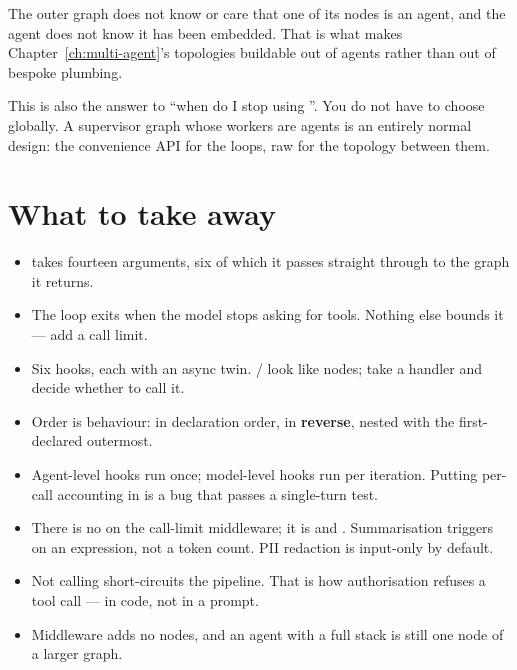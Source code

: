 The outer graph does not know or care that one of its nodes is an agent, and the
agent does not know it has been embedded. That is what makes
Chapter~\ref{ch:multi-agent}'s topologies buildable out of agents rather than out
of bespoke plumbing.

\begin{note}
This is also the answer to ``when do I stop using ''. You do
not have to choose globally. A supervisor graph whose workers are
 agents is an entirely normal design: the convenience API for
the loops, raw  for the topology between them.
\end{note}

\section{What to take away}
\label{sec:ch7-summary}

\begin{itemize}[leftmargin=1.4em]
\item {} takes fourteen arguments, six of which it passes
      straight through to the graph it returns.
\item The loop exits when the model stops asking for tools. Nothing else bounds
      it --- add a call limit.
\item Six hooks, each with an async twin. / look
      like nodes;  take a handler and decide whether to call it.
\item Order is behaviour:  in declaration order, 
      in \textbf{reverse},  nested with the first-declared
      outermost.
\item Agent-level hooks run once; model-level hooks run per iteration. Putting
      per-call accounting in  is a bug that passes a
      single-turn test.
\item There is no  on the call-limit middleware; it is
       and . Summarisation triggers on an
      expression, not a token count. PII redaction is input-only by default.
\item Not calling  short-circuits the pipeline. That is how
      authorisation refuses a tool call --- in code, not in a prompt.
\item Middleware adds no nodes, and an agent with a full stack is still one node
      of a larger graph.
\end{itemize}

